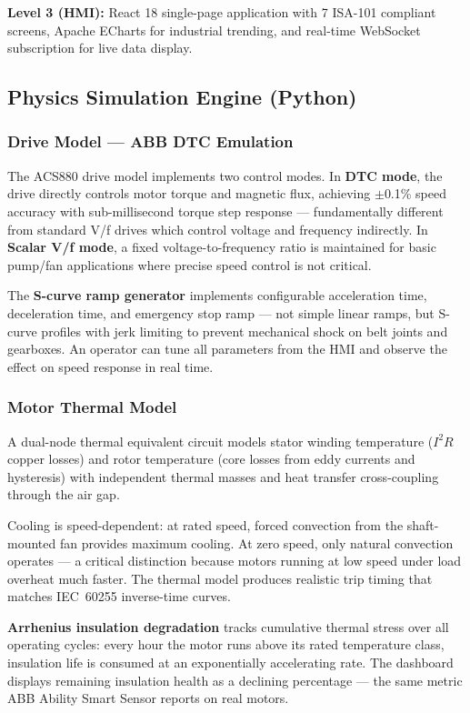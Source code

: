 \documentclass[9pt,a4paper,twocolumn,twoside]{tau-class/tau}
\begin{document}
\textbf{Level 3 (HMI):} React 18 single-page application with 7 ISA-101 compliant screens, Apache ECharts for industrial trending, and real-time WebSocket subscription for live data display.

\subsection{Physics Simulation Engine (Python)}

\subsubsection{Drive Model — ABB DTC Emulation}

The ACS880 drive model implements two control modes. In \textbf{DTC mode}, the drive directly controls motor torque and magnetic flux, achieving $\pm$0.1\% speed accuracy with sub-millisecond torque step response — fundamentally different from standard V/f drives which control voltage and frequency indirectly. In \textbf{Scalar V/f mode}, a fixed voltage-to-frequency ratio is maintained for basic pump/fan applications where precise speed control is not critical.

The \textbf{S-curve ramp generator} implements configurable acceleration time, deceleration time, and emergency stop ramp — not simple linear ramps, but S-curve profiles with jerk limiting to prevent mechanical shock on belt joints and gearboxes. An operator can tune all parameters from the HMI and observe the effect on speed response in real time.

\subsubsection{Motor Thermal Model}

A dual-node thermal equivalent circuit models stator winding temperature ($I^2R$ copper losses) and rotor temperature (core losses from eddy currents and hysteresis) with independent thermal masses and heat transfer cross-coupling through the air gap.

Cooling is speed-dependent: at rated speed, forced convection from the shaft-mounted fan provides maximum cooling. At zero speed, only natural convection operates — a critical distinction because motors running at low speed under load overheat much faster. The thermal model produces realistic trip timing that matches IEC~60255 inverse-time curves.

\textbf{Arrhenius insulation degradation} tracks cumulative thermal stress over all operating cycles: every hour the motor runs above its rated temperature class, insulation life is consumed at an exponentially accelerating rate. The dashboard displays remaining insulation health as a declining percentage — the same metric ABB Ability Smart Sensor reports on real motors.
\end{document}
